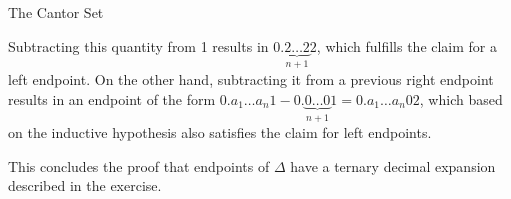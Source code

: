 \begin{section}{The Cantor Set}
\begin{solution}
\begin{itemize}
        Subtracting this quantity from 1 results in $0.\underbrace{2 \ldots 2}_{n + 1} 2$, which fulfills the claim for a left endpoint.
        On the other hand, subtracting it from a previous right endpoint results in an endpoint of the form $0.a_1 \ldots a_n 1 - 0.\underbrace{0 \ldots 0}_{n + 1} 1 = 0.a_1 \ldots a_n 0 2$, which based on the inductive hypothesis also satisfies the claim for left endpoints.
    \end{itemize}
    This concludes the proof that endpoints of $\Delta$ have a ternary decimal expansion described in the exercise.
\end{solution}

\end{section}